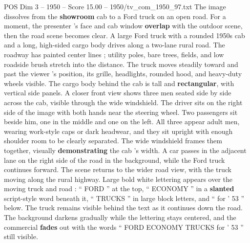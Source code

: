 \begin{textsample}{POS Dim 3 – 1950 – Score 15.00 – 1950/tv\_com\_1950\_97.txt}
The image dissolves from the \textbf{showroom} cab to a Ford truck on an open road.
For a moment, the presenter ’s face and cab window \textbf{overlap} with the outdoor scene, then the road scene becomes clear.
A large Ford truck with a rounded 1950s cab and a long, high-sided cargo body drives along a two-lane rural road.
The roadway has painted center lines ; utility poles, bare trees, fields, and low roadside brush stretch into the distance.
The truck moves steadily toward and past the viewer ’s position, its grille, headlights, rounded hood, and heavy-duty wheels visible.
The cargo body behind the cab is tall and \textbf{rectangular}, with vertical side panels.
A closer front view shows three men seated side by side across the cab, visible through the wide windshield.
The driver sits on the right side of the image with both hands near the steering wheel.
Two passengers sit beside him, one in the middle and one on the left.
All three appear adult men, wearing work-style caps or dark headwear, and they sit upright with enough shoulder room to be clearly separated.
The wide windshield frames them together, visually \textbf{demonstrating} the cab ’s width.
A car passes in the adjacent lane on the right side of the road in the background, while the Ford truck continues forward.
The scene returns to the wider road view, with the truck moving along the rural highway.
Large bold white lettering appears over the moving truck and road : “ FORD ” at the top, “ ECONOMY ” in a \textbf{slanted} script-style word beneath it, “ TRUCKS ” in large block letters, and “ for ’ 53 ” below.
The truck remains visible behind the text as it continues down the road.
The background darkens gradually while the lettering stays centered, and the commercial \textbf{fades} out with the words “ FORD ECONOMY TRUCKS for ’ 53 ” still visible.

\end{textsample}
